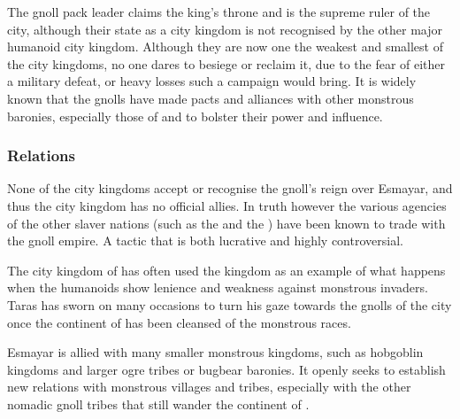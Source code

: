 The gnoll pack leader claims the king's throne and is the supreme ruler of the
city, although their state as a city kingdom is not recognised by the other
major humanoid city kingdom. Although they are now one the weakest and
smallest of the city kingdoms, no one dares to besiege or reclaim it, due to
the fear of either a military defeat, or heavy losses such a campaign would
bring. It is widely known that the gnolls have made pacts and alliances with
other monstrous baronies, especially those of  and
 to bolster their power and influence.

\subsubsection{Relations}


None of the city kingdoms accept or recognise the gnoll's reign over Esmayar,
and thus the city kingdom has no official allies. In truth however the various
agencies of the other slaver nations (such as the 
and the ) have been known to trade with the gnoll
empire. A tactic that is both lucrative and highly controversial.

The city kingdom of  has often used the kingdom as an
example of what happens when the humanoids show lenience and weakness against
monstrous invaders. Taras has sworn on many occasions to turn his gaze towards
the gnolls of the city once the continent of  has been
cleansed of the monstrous races.

Esmayar is allied with many smaller monstrous kingdoms, such as hobgoblin
kingdoms and larger ogre tribes or bugbear baronies. It openly seeks to
establish new relations with monstrous villages and tribes, especially with
the other nomadic gnoll tribes that still wander the continent of
.
